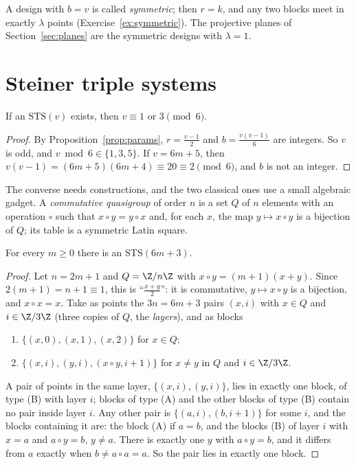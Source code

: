 A design with $b=v$ is called \emph{symmetric}; then $r=k$, and any two blocks meet in exactly $\lambda$ points (Exercise~\ref{ex:symmetric}). The projective planes of
Section~\ref{sec:planes} are the symmetric designs with $\lambda=1$.

\section{Steiner triple systems}

\begin{proposition}\label{prop:stsnec}
If an $\mathrm{STS}(v)$ exists, then $v\equiv1$ or $3\pmod 6$.
\end{proposition}
\begin{proof}
By Proposition~\ref{prop:params}, $r=\frac{v-1}2$ and $b=\frac{v(v-1)}6$ are integers. So $v$ is odd, and $v\bmod6\in\{1,3,5\}$. If $v=6m+5$, then $v(v-1)=(6m+5)(6m+4)\equiv20\equiv2\pmod 6$,
and $b$ is not an integer.
\end{proof}

The converse needs constructions, and the two classical ones use a small algebraic gadget. A \emph{commutative quasigroup} of order $n$ is a set $Q$ of $n$ elements with an operation
$\circ$ such that $x\circ y=y\circ x$ and, for each $x$, the map $y\mapsto x\circ y$ is a bijection of $Q$; its table is a symmetric Latin square.

\begin{theorem}[Bose, 1939]\label{thm:bose}
For every $m\ge0$ there is an $\mathrm{STS}(6m+3)$.
\end{theorem}
\begin{proof}
Let $n=2m+1$ and $Q=\Z/n\Z$ with $x\circ y=(m+1)(x+y)$. Since $2(m+1)=n+1\equiv1$, this is ``$\frac{x+y}2$'': it is commutative, $y\mapsto x\circ y$ is a bijection, and $x\circ x=x$. Take as points
the $3n=6m+3$ pairs $(x,i)$ with $x\in Q$ and $i\in\Z/3\Z$ (three copies of $Q$, the \emph{layers}), and as blocks
\begin{enumerate}[label=(\Alph*)]
\item $\{(x,0),(x,1),(x,2)\}$ for $x\in Q$;
\item $\{(x,i),(y,i),(x\circ y,i+1)\}$ for $x\ne y$ in $Q$ and $i\in\Z/3\Z$.
\end{enumerate}
A pair of points in the same layer, $\{(x,i),(y,i)\}$, lies in exactly one block, of type (B) with layer $i$; blocks of type (A) and the other blocks of type (B) contain no
pair inside layer $i$. Any other pair is $\{(a,i),(b,i+1)\}$ for some $i$, and the blocks containing it are: the block (A) if $a=b$, and the blocks (B) of layer $i$ with
$x=a$ and $a\circ y=b$, $y\ne a$. There is exactly one $y$ with $a\circ y=b$, and it differs from $a$ exactly when $b\ne a\circ a=a$. So the pair lies in exactly one block.
\end{proof}

